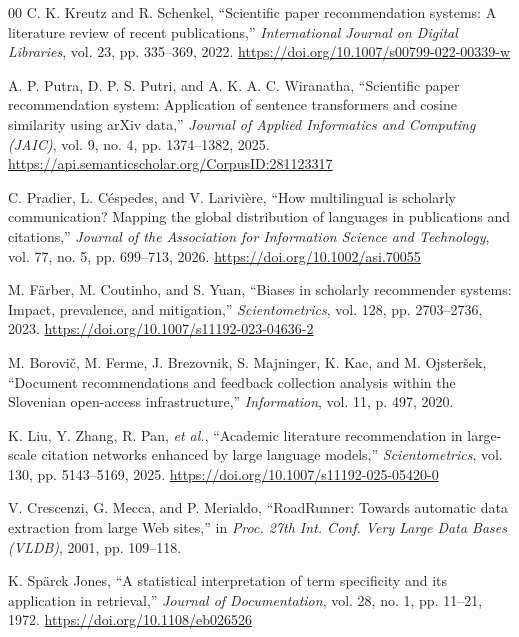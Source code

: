\documentclass[conference]{IEEEtran}
\begin{document}
\begin{thebibliography}{00}
C. K. Kreutz and R. Schenkel,
``Scientific paper recommendation systems: A literature review of recent publications,''
\textit{International Journal on Digital Libraries}, vol. 23, pp. 335--369, 2022.
\url{https://doi.org/10.1007/s00799-022-00339-w}

A. P. Putra, D. P. S. Putri, and A. K. A. C. Wiranatha,
``Scientific paper recommendation system: Application of sentence transformers and cosine similarity using arXiv data,''
\textit{Journal of Applied Informatics and Computing (JAIC)}, vol. 9, no. 4, pp. 1374--1382, 2025.
\url{https://api.semanticscholar.org/CorpusID:281123317}

C. Pradier, L. Céspedes, and V. Larivière,
``How multilingual is scholarly communication? Mapping the global distribution of languages in publications and citations,''
\textit{Journal of the Association for Information Science and Technology}, vol. 77, no. 5, pp. 699--713, 2026.
\url{https://doi.org/10.1002/asi.70055}

M. Färber, M. Coutinho, and S. Yuan,
``Biases in scholarly recommender systems: Impact, prevalence, and mitigation,''
\textit{Scientometrics}, vol. 128, pp. 2703--2736, 2023.
\url{https://doi.org/10.1007/s11192-023-04636-2}

M. Borovič, M. Ferme, J. Brezovnik, S. Majninger, K. Kac, and M. Ojsteršek,
``Document recommendations and feedback collection analysis within the Slovenian open-access infrastructure,''
\textit{Information}, vol. 11, p. 497, 2020.

K. Liu, Y. Zhang, R. Pan, \textit{et al.},
``Academic literature recommendation in large-scale citation networks enhanced by large language models,''
\textit{Scientometrics}, vol. 130, pp. 5143--5169, 2025.
\url{https://doi.org/10.1007/s11192-025-05420-0}




V. Crescenzi, G. Mecca, and P. Merialdo,
``RoadRunner: Towards automatic data extraction from large Web sites,''
in \textit{Proc. 27th Int. Conf. Very Large Data Bases (VLDB)}, 2001,
pp. 109--118.


K. Spärck Jones,
``A statistical interpretation of term specificity and its application in retrieval,''
\textit{Journal of Documentation}, vol. 28, no. 1, pp. 11--21, 1972.
\url{https://doi.org/10.1108/eb026526}


\end{thebibliography}
\end{document}
